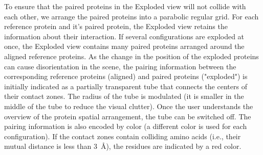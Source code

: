 \documentclass{bmcart}
\def\ExpView {Exploded view\xspace}
\begin{document}
To ensure that the paired proteins in the Exploded view will not collide with each other, we arrange the paired proteins into a parabolic regular grid.
For each reference protein and it's paired protein, the \ExpView retains the information about their interaction.
If several configurations are exploded at once, the \ExpView contains many paired proteins arranged around the aligned reference proteins.
As the change in the position of the exploded proteins can cause disorientation in the scene, the pairing information between the corresponding reference proteins (aligned) and paired proteins ("exploded") is initially indicated as a partially transparent tube that connects the centers of their contact zones.
The radius of the tube is modulated (it is smaller in the middle of the tube to reduce the visual clutter).
Once the user understands the overview of the protein spatial arrangement, the tube can be switched off.
The pairing information is also encoded by color (a different color is used for each configuration).
If the contact zones contain colliding amino acids (i.e., their mutual distance is less than 3~\AA), the residues are indicated by a red color.
\end{document}
